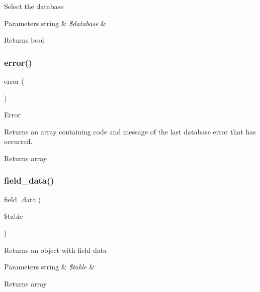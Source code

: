 Select the database


\begin{DoxyParams}[1]{Parameters}
string & {\em \$database} & \\
\hline
\end{DoxyParams}
\begin{DoxyReturn}{Returns}
bool 
\end{DoxyReturn}
\mbox{\label{class_c_i___d_b__sqlsrv__driver_a43b8d30b879d4f09ceb059b02af2bc02}} 
\subsubsection{\texorpdfstring{error()}{error()}}
{\footnotesize\ttfamily error (\begin{DoxyParamCaption}{ }\end{DoxyParamCaption})}

Error

Returns an array containing code and message of the last database error that has occurred.

\begin{DoxyReturn}{Returns}
array 
\end{DoxyReturn}
\mbox{\label{class_c_i___d_b__sqlsrv__driver_a90355121e1ed009e0efdbd544ab56efa}} 
\subsubsection{\texorpdfstring{field\+\_\+data()}{field\_data()}}
{\footnotesize\ttfamily field\+\_\+data (\begin{DoxyParamCaption}\item[{}]{\$table }\end{DoxyParamCaption})}

Returns an object with field data


\begin{DoxyParams}[1]{Parameters}
string & {\em \$table} & \\
\hline
\end{DoxyParams}
\begin{DoxyReturn}{Returns}
array 
\end{DoxyReturn}
\mbox{\label{class_c_i___d_b__sqlsrv__driver_a933f2cde8dc7f87875e257d0a4902e99}} 
